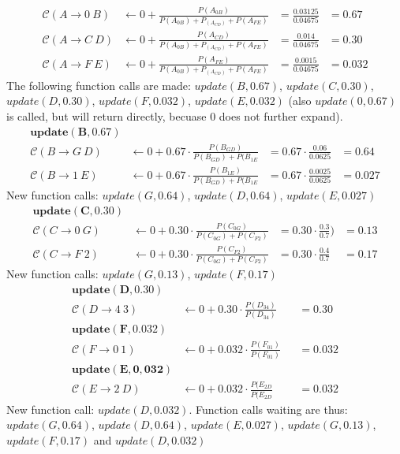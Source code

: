 \documentclass{article}
\newcommand{\C}{\mathcal{C}}
\begin{document}
\begin{align*}
\C(A\rightarrow 0~B) &\leftarrow 0 + \frac{P(A_{0B})}{P(A_{0B})+P_(A_{CD})+P(A_{FE})} &= \frac{0.03125}{0.04675} &= 0.67\\
\C(A\rightarrow C~D) &\leftarrow 0 + \frac{P(A_{CD})}{P(A_{0B})+P_(A_{CD})+P(A_{FE})} &= \frac{0.014}{0.04675} &= 0.30\\
\C(A\rightarrow F~E) &\leftarrow 0 + \frac{P(A_{FE})}{P(A_{0B})+P_(A_{CD})+P(A_{FE})} &= \frac{0.0015}{0.04675} &= 0.032
\end{align*}
The following function calls are made: $update(B,0.67)$, $update(C,0.30)$, $update(D,0.30)$, $update(F,0.032)$, $update(E,0.032)$ (also $update(0,0.67)$ is called, but will return directly, becuase $0$ does not further expand).
\begin{align*}
\mathbf{update(B,0.67)}\\
\C(B\rightarrow G~D) &\leftarrow 0 + 0.67\cdot\frac{P(B_{GD})}{P(B_{GD})+P(B_{1E}} &= 0.67 \cdot\frac{0.06}{0.0625} &= 0.64\\
\C(B\rightarrow 1~E) &\leftarrow 0 + 0.67\cdot\frac{P(B_{1E})}{P(B_{GD})+P(B_{1E}} &= 0.67\cdot \frac{0.0025}{0.0625} &= 0.027
\end{align*}
New function calls: $update(G,0.64)$, $update(D,0.64)$, $update(E,0.027)$
\begin{align*}
\mathbf{update(C,0.30)}\\
\C(C\rightarrow 0~G) &\leftarrow 0 + 0.30\cdot\frac{P(C_{0G})}{P(C_{0G})+P(C_{F2})} &= 0.30\cdot\frac{0.3}{0.7}) &= 0.13\\
\C(C\rightarrow F~2) &\leftarrow 0 + 0.30\cdot\frac{P(C_{F2})}{P(C_{0G})+P(C_{F2})} &= 0.30\cdot\frac{0.4}{0.7} &= 0.17
\end{align*}
New function calls: $update(G,0.13)$, $update(F,0.17)$
\begin{align*}
\mathbf{update(D,0.30)}\\
\C(D\rightarrow 4~3) &\leftarrow 0 + 0.30\cdot \frac{P(D_{34})}{P(D_{34})} &  &= 0.30\\
\mathbf{update(F,0.032)}\\
\C(F\rightarrow 0~1) &\leftarrow 0 + 0.032\cdot \frac{P(F_{01})}{P(F_{01})} &&= 0.032\\
\mathbf{update(E,0,032)}\\
\C(E\rightarrow 2~D) &\leftarrow 0 + 0.032\cdot \frac{P(E_{2D}}{P(E_{2D}} &&= 0.032
\end{align*}
New function call: $update(D,0.032)$. Function calls waiting are thus: $update(G,0.64)$, $update(D,0.64)$, $update(E,0.027)$, $update(G,0.13)$, $update(F,0.17)$ and $update(D,0.032)$
\end{document}
